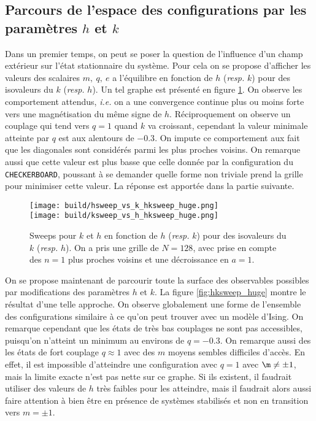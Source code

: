 \documentclass[a4paper, 11pt]{article}
\begin{document}
\subsection{Parcours de l'espace des configurations par les paramètres $h$ et $k$}

Dans un premier temps, on peut se poser la question de l'influence d'un champ extérieur sur l'état
stationnaire du système. Pour cela on se propose d'afficher les valeurs des scalaires $m,~q,~e$ a
l'équilibre en fonction de $h$ (\emph{resp.} $k$) pour des isovaleurs du $k$ (\emph{resp.} $h$). Un
tel graphe est présenté en figure \ref{fig:hksweeps}. On observe les comportement attendus,
\emph{i.e.} on a une convergence continue plus ou moins forte vers une magnétisation du même signe
de $h$. Réciproquement on observe un couplage qui tend vers $q=1$ quand $k$ va croissant, cependant
la valeur minimale atteinte par $q$ est aux alentours de $-0.3$. On impute ce comportement aux fait
que les diagonales sont considérés parmi les plus proches voisins. On remarque aussi que cette
valeur est plus basse que celle donnée par la configuration du \texttt{CHECKERBOARD}, poussant à se
demander quelle forme non triviale prend la grille pour minimiser cette valeur. La réponse est
apportée dans la partie suivante.

\begin{figure}
    \centering
    \texttt{[image: build/hsweep\_vs\_k\_hksweep\_huge.png]} \\
    \texttt{[image: build/ksweep\_vs\_h\_hksweep\_huge.png]}
    \caption{Sweeps pour $k$ et $h$ en fonction de $h$ (\emph{resp.} $k$) pour des isovaleurs du $k$
    (\emph{resp.} $h$). On a pris une grille de $N=128$, avec prise en compte des $n=1$ plus
    proches voisins et une décroissance en $a=1$.}
    \label{fig:hksweeps}
\end{figure}


On se propose maintenant de parcourir toute la surface des observables possibles par modifications
des paramètres $h$ et $k$. La figure \ref{fig:hksweep_huge} montre le résultat d'une telle approche.
On observe globalement une forme de l'ensemble des configurations similaire à ce qu'on peut trouver
avec un modèle d'Ising. On remarque cependant que les états de très bas couplages ne sont pas
accessibles, puisqu'on n'atteint un minimum au environs de $q=-0.3$. On remarque aussi des les états
de fort couplage $q \approx 1$ avec des $m$ moyens sembles difficiles d'accès. En effet, il est
impossible d'atteindre une configuration avec $q=1$ avec $\m \neq \pm 1$, mais la limite exacte
n'est pas nette sur ce graphe. Si ils existent, il faudrait utiliser des valeurs de $h$ très faibles
pour les atteindre, mais il faudrait alors aussi faire attention à bien être en présence de systèmes
stabilisés et non en transition vers $m = \pm 1$. 
\end{document}
